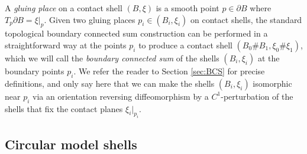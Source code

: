 \documentclass[12pt]{paper}
\theoremstyle{plain}
\theoremstyle{definition}
\newcommand{\p}{\partial}
\newcommand{\FF}{\mathcal{F}}
\numberwithin{figure}{section}
\begin{document}
  
  
  
  
     A \emph{gluing place} on a contact shell $(B, \xi)$ is a smooth point $p \in \p B$ where  $T_{p}\p B = \xi|_{p}$.
     Given two gluing places $p_i \in (B_i, \xi_i)$ on contact shells,
     the standard topological boundary connected sum construction can be performed in a  straightforward way
     at the points $p_i$ to produce a contact shell $(B_0\#B_1,\xi_0\#\xi_1)$, which we will call the {\em boundary connected sum}
of the shells  $(B_i,\xi_i)$ at the boundary  points $p_i$.
%
%     
We refer the reader to Section \ref{sec:BCS} for precise definitions, and only say here that we can make the shells 
$(B_i,\xi_i)$ isomorphic near $p_i$ via an orientation reversing diffeomorphism by a $C^1$-perturbation of the shells that fix the contact planes $\xi_i|_{p_i}$.

\subsection{Circular model shells}\label{sec:ContactHamShell}
\end{document}
